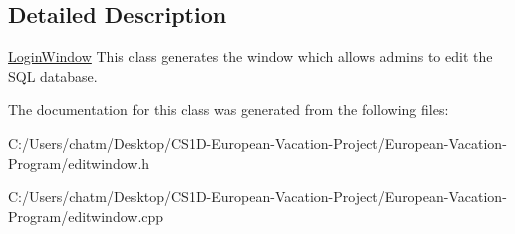 \subsection{Detailed Description}
\mbox{\hyperlink{class_login_window}{Login\+Window}} This class generates the window which allows admins to edit the S\+QL database. 

The documentation for this class was generated from the following files\+:\begin{DoxyCompactItemize}
\item 
C\+:/\+Users/chatm/\+Desktop/\+C\+S1\+D-\/\+European-\/\+Vacation-\/\+Project/\+European-\/\+Vacation-\/\+Program/editwindow.\+h\item 
C\+:/\+Users/chatm/\+Desktop/\+C\+S1\+D-\/\+European-\/\+Vacation-\/\+Project/\+European-\/\+Vacation-\/\+Program/editwindow.\+cpp\end{DoxyCompactItemize}
